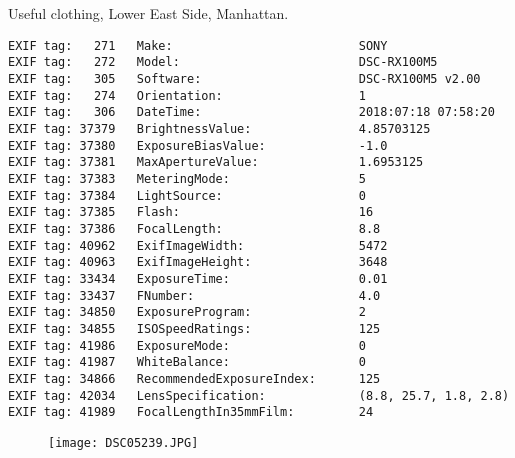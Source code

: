 \section{\protect{}}
\noindent Useful clothing, Lower East Side, Manhattan.
\noindent
\begin{lstlisting}
EXIF tag:   271   Make:                          SONY
EXIF tag:   272   Model:                         DSC-RX100M5
EXIF tag:   305   Software:                      DSC-RX100M5 v2.00
EXIF tag:   274   Orientation:                   1
EXIF tag:   306   DateTime:                      2018:07:18 07:58:20
EXIF tag: 37379   BrightnessValue:               4.85703125
EXIF tag: 37380   ExposureBiasValue:             -1.0
EXIF tag: 37381   MaxApertureValue:              1.6953125
EXIF tag: 37383   MeteringMode:                  5
EXIF tag: 37384   LightSource:                   0
EXIF tag: 37385   Flash:                         16
EXIF tag: 37386   FocalLength:                   8.8
EXIF tag: 40962   ExifImageWidth:                5472
EXIF tag: 40963   ExifImageHeight:               3648
EXIF tag: 33434   ExposureTime:                  0.01
EXIF tag: 33437   FNumber:                       4.0
EXIF tag: 34850   ExposureProgram:               2
EXIF tag: 34855   ISOSpeedRatings:               125
EXIF tag: 41986   ExposureMode:                  0
EXIF tag: 41987   WhiteBalance:                  0
EXIF tag: 34866   RecommendedExposureIndex:      125
EXIF tag: 42034   LensSpecification:             (8.8, 25.7, 1.8, 2.8)
EXIF tag: 41989   FocalLengthIn35mmFilm:         24

\end{lstlisting}
\clearpage
\begin{figure}
\raggedleft
\texttt{[image: DSC05239.JPG]}
\end{figure}

